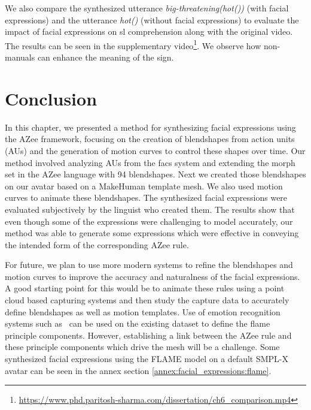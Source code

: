 \documentclass[../../main]{subfiles}
\begin{document}
We also compare the synthesized utterance \emph{big-threatening(hot())} (with facial expressions) and the utterance \emph{hot()} (without facial expressions) to evaluate the impact of facial expressions on \gls{sl} comprehension along with the original video. The results can be seen in the supplementary video\footnote{\url{https://www.phd.paritosh-sharma.com/dissertation/ch6_comparison.mp4}}. We observe how non-manuals can enhance the meaning of the sign.

\section{Conclusion}
\label{ch:facial_expressions:conclusion}

In this chapter, we presented a method for synthesizing facial expressions using the AZee framework, focusing on the creation of blendshapes from action units (AUs) and the generation of motion curves to control these shapes over time. Our method involved analyzing AUs from the \gls{facs} system and extending the morph set in the AZee language with 94 blendshapes. Next we created those blendshapes on our avatar based on a MakeHuman template mesh. We also used motion curves to animate these blendshapes. The synthesized facial expressions were evaluated subjectively by the linguist who created them. The results show that even though some of the expressions were challenging to model accurately, our method was able to generate some expressions which were effective in conveying the intended form of the corresponding AZee rule.

For future, we plan to use more modern systems to refine the blendshapes and motion curves to improve the accuracy and naturalness of the facial expressions. A good starting point for this would be to animate these rules using a point cloud based capturing systems and then study the capture data to accurately define blendshapes as well as motion templates. Use of emotion recognition systems such as~\cite{EMOCA} can be used on the existing dataset to define the flame~\cite{FLAME} principle components. However, establishing a link between the AZee rule and these principle components which drive the mesh will be a challenge. Some synthesized facial expressions using the FLAME model on a default SMPL-X avatar can be seen in the annex section \ref{annex:facial_expressions:flame}.
\end{document}
